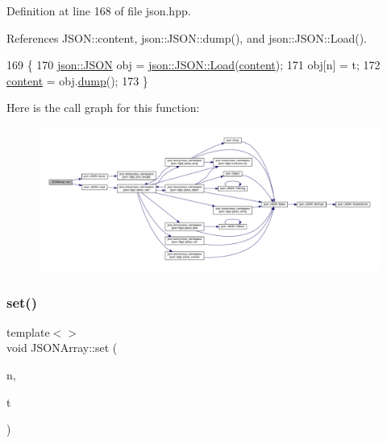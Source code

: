 Definition at line 168 of file json.\+hpp.



References J\+S\+O\+N\+::content, json\+::\+J\+S\+O\+N\+::dump(), and json\+::\+J\+S\+O\+N\+::\+Load().


\begin{DoxyCode}
169 \{
170         \mbox{\hyperlink{classjson_1_1_j_s_o_n}{json::JSON}} obj = \mbox{\hyperlink{classjson_1_1_j_s_o_n_a799ab1cc68cb6e2a41ec948a9a2ecc37}{json::JSON::Load}}(\mbox{\hyperlink{class_j_s_o_n_ad1ace77234b963a2994178ce7f76a181}{content}});
171         obj[n] = t;
172         \mbox{\hyperlink{class_j_s_o_n_ad1ace77234b963a2994178ce7f76a181}{content}} = obj.\mbox{\hyperlink{classjson_1_1_j_s_o_n_acb99af0df2045a504f6bbc08bf5c4990}{dump}}();
173 \}
\end{DoxyCode}
Here is the call graph for this function\+:
\nopagebreak
\begin{figure}[H]
\begin{center}
\leavevmode
\includegraphics[width=350pt]{class_j_s_o_n_array_ad012cef04a71b2e708d28f88f3c1c4e7_cgraph}
\end{center}
\end{figure}
\mbox{\label{class_j_s_o_n_array_a40043037244507bd344c9cae26962bde}} 
\subsubsection{\texorpdfstring{set()}{set()}\hspace{0.1cm}{\footnotesize\ttfamily [2/4]}}
{\footnotesize\ttfamily template$<$$>$ \\
void J\+S\+O\+N\+Array\+::set (\begin{DoxyParamCaption}\item[{int}]{n,  }\item[{\mbox{\hyperlink{class_j_s_o_n}{J\+S\+ON}}}]{t }\end{DoxyParamCaption})\hspace{0.3cm}{\ttfamily [inline]}}

